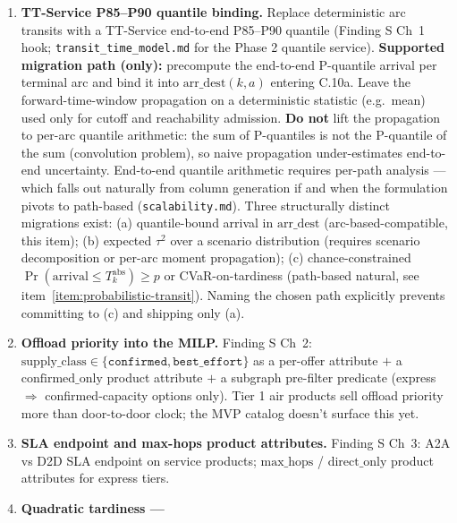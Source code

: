 \documentclass[11pt,a4paper]{article}
\theoremstyle{definition}
\begin{document}
\begin{enumerate}
  \item \label{item:tt-quantile-binding} \textbf{TT-Service P85--P90 quantile
        binding.} Replace deterministic arc transits with a TT-Service
        end-to-end P85--P90 quantile (Finding S Ch~1 hook;
        \texttt{transit\_time\_model.md} for the Phase 2 quantile service).
        \textbf{Supported migration path (only):} precompute the end-to-end
        P-quantile arrival per terminal arc and bind it into
        $\text{arr\_dest}(k, a)$ entering C.10a. Leave the forward-time-window
        propagation on a deterministic statistic (e.g.\ mean) used only for
        cutoff and reachability admission. \textbf{Do not} lift the
        propagation to per-arc quantile arithmetic: the sum of P-quantiles is
        not the P-quantile of the sum (convolution problem), so naive
        propagation under-estimates end-to-end uncertainty. End-to-end
        quantile arithmetic requires per-path analysis --- which falls out
        naturally from column generation if and when the formulation pivots
        to path-based (\texttt{scalability.md}). Three structurally distinct
        migrations exist: (a) quantile-bound arrival in $\text{arr\_dest}$
        (arc-based-compatible, this item); (b) expected $\tau^2$ over a
        scenario distribution (requires scenario decomposition or per-arc
        moment propagation); (c) chance-constrained $\Pr(\text{arrival} \leq
        T_k^{\text{abs}}) \geq p$ or CVaR-on-tardiness (path-based natural,
        see item~\ref{item:probabilistic-transit}). Naming the chosen path
        explicitly prevents committing to (c) and shipping only (a).
  \item \label{item:offload-priority} \textbf{Offload priority into the
        MILP.} Finding S Ch~2: $\text{supply\_class} \in \{\texttt{confirmed},
        \texttt{best\_effort}\}$ as a per-offer attribute $+$ a
        $\text{confirmed\_only}$ product attribute $+$ a subgraph pre-filter
        predicate (express $\Rightarrow$ confirmed-capacity options only).
        Tier 1 air products sell offload priority more than door-to-door
        clock; the MVP catalog doesn't surface this yet.
  \item \label{item:sla-endpoint-and-hops} \textbf{SLA endpoint and max-hops
        product attributes.} Finding S Ch~3: A2A vs D2D SLA endpoint on
        service products; $\text{max\_hops}$ / $\text{direct\_only}$ product
        attributes for express tiers.
  \item \label{item:quadratic-tardiness} \textbf{Quadratic tardiness ---
}
\end{enumerate}
\end{document}
